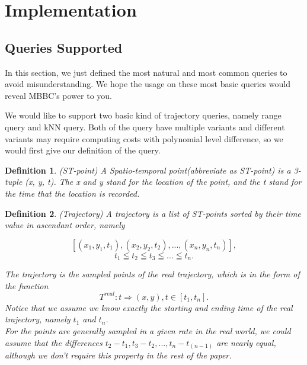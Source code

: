 \documentclass[sigplan]{acmart}
\newtheorem{myDef}{Definition}
\begin{document}
\section{Implementation}
\subsection{Queries Supported}
In this section, we just defined the most natural and most common queries to avoid misunderstanding. We hope the usage on these most basic queries would reveal MBBC's power to you.\par
We would like to support two basic kind of trajectory queries, namely range query and kNN query. Both of the query have multiple variants and different variants may require computing costs with polynomial level difference, so we would first give our definition of the query. \par
\begin{myDef}
  (ST-point) A Spatio-temporal point(abbreviate as ST-point) is a 3-tuple (x, y, t). The x and y stand for the location of the point, and the t stand for the time that the location is recorded.
\end{myDef}
\begin{myDef}
  (Trajectory) A trajectory is a list of ST-points sorted by their time value in ascendant order, namely

     $$[(x_1, y_1, t_1), (x_2, y_2, t_2), ..., (x_n, y_n, t_n)], $$
     $$t_1 \leqq t_2 \leqq t_3 \leqq ... \leqq t_n .$$

   The trajectory is the sampled points of the real trajectory, which is in the form of the function
   $$T^{real}: t \Rightarrow (x, y), t\in [t_1, t_n].$$
   Notice that we assume we know exactly the starting and ending time of the real trajectory, namely $t_1$ and $t_n$.\\
   For the points are generally sampled in a given rate in the real world, we could assume that the differences $t_2-t_1, t_3-t_2, ... , t_n- t_(n-1)$ are nearly equal, although we don't require this property in the rest of the paper.
\end{myDef}
\end{document}
